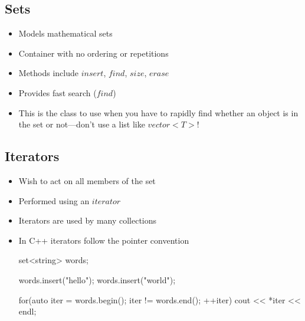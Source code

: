 \begin{slide}
\section{Sets}

\begin{PauseHighLight}
  \begin{itemize}
  \item Models mathematical sets\pause
  \item Container with no ordering or repetitions\pause
  \item Methods include \jl$insert$, \jl$find$, \jl$size$,
    \jl$erase$\pause
  \item Provides fast search (\jl$find$)\pause
  \item This is the class to use when you have to rapidly find whether
    an object is in the set or not\pause---don't use a list like
    \jl$vector<T>$!\pauseb
\end{itemize}  
\end{PauseHighLight}
\end{slide}


\begin{slide}
\section{Iterators}

\begin{PauseHighLight}
  \begin{itemize}
  \item Wish to act on all members of the set\pause
  \item Performed using an \jl$iterator$\pause
  \item Iterators are used by many collections\pause
  \item In C++ iterators follow the pointer convention\pause
    \begin{cpp}
      set<string> words;

      words.insert("hello");
      words.insert("world");
      
      for(auto iter = words.begin(); iter != words.end(); ++iter) {
        cout << *iter << endl;
      }
    \end{cpp}\pause
  \end{itemize}
\end{PauseHighLight}

\end{slide}

